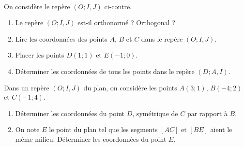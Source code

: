 \documentclass[11pt]{article}
\begin{document}
\begin{exo}~\\[-4mm]
  \begin{minipage}{.5\textwidth}
   On considère le repère $(O; I, J)$ ci-contre.
   \begin{enumerate}
     \item Le repère $(O; I, J)$ est-il orthonormé ? Orthogonal ?
     \item Lire les coordonnées des points $A$, $B$ et $C$ dans le repère
       $(O; I, J)$.
     \item Placer les points $D(1; 1)$ et $E(-1;0)$.
     \item Déterminer les coordonnées de tous les points dans le repère
       $(D; A, I)$.
   \end{enumerate}
  \end{minipage}
  \begin{minipage}{.5\textwidth}
  \begin{center}
\end{center}
\end{minipage}
\end{exo}

\begin{exo}
Dans un repère $(O; I, J)$ du plan, on considère les
points $A(3;1)$, $B(-4; 2)$ et $C(-1; 4)$.
\begin{enumerate}
  \item Déterminer les coordonnées du point $D$, symétrique de $C$ par rapport à
    $B$.
  \item On note $E$ le point du plan tel que les segments $\left[ AC
    \right]$ et $\left[ BE \right]$ aient le même milieu. Déterminer les
    coordonnées du point $E$.
\end{enumerate}
\end{exo}
\end{document}
